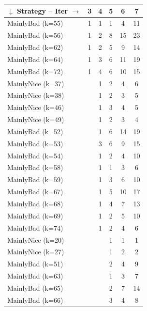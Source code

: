 \documentclass[journal,10pt,twoside]{IEEEtran}
\begin{document}
\begin{table}[ht]
\begin{minipage}{.35\textwidth}
\begin{tabular}{l|ccccc}
        $\downarrow$ Strategy -- Iter $\rightarrow$ & 3 & 4 & 5 & 6 & 7 \\ \midrule
        MainlyBad (k=55)    &    1 &    1 &    1 &    4 &   11 \\
        MainlyBad (k=56)    &    1 &    2 &    8 &   15 &   23 \\
        MainlyBad (k=62)    &    1 &    2 &    5 &    9 &   14 \\
        MainlyBad (k=64)    &    1 &    3 &    6 &   11 &   19 \\
        MainlyBad (k=72)    &    1 &    4 &    6 &   10 &   15 \\
        MainlyNice (k=37)   &      &    1 &    2 &    4 &    6 \\
        MainlyNice (k=38)   &      &    1 &    2 &    3 &    5 \\
        MainlyNice (k=46)   &      &    1 &    3 &    4 &    5 \\
        MainlyNice (k=49)   &      &    1 &    2 &    3 &    4 \\
        MainlyBad (k=52)    &      &    1 &    6 &   14 &   19 \\
        MainlyBad (k=53)    &      &    3 &    6 &    9 &   15 \\
        MainlyBad (k=54)    &      &    1 &    2 &    4 &   10 \\
        MainlyBad (k=58)    &      &    1 &    1 &    3 &    6 \\
        MainlyBad (k=59)    &      &    1 &    3 &    6 &   10 \\
        MainlyBad (k=67)    &      &    1 &    5 &   10 &   17 \\
        MainlyBad (k=68)    &      &    1 &    4 &    7 &   13 \\
        MainlyBad (k=69)    &      &    1 &    2 &    5 &   10 \\
        MainlyBad (k=74)    &      &    1 &    2 &    4 &    6 \\
        MainlyNice (k=20)   &      &      &    1 &    1 &    1 \\
        MainlyNice (k=27)   &      &      &    1 &    2 &    2 \\
        MainlyBad (k=51)    &      &      &    2 &    4 &    9 \\
        MainlyBad (k=63)    &      &      &    1 &    3 &    7 \\
        MainlyBad (k=65)    &      &      &    2 &    7 &   14 \\
        MainlyBad (k=66)    &      &      &    3 &    4 &    8 \\

\end{tabular}
\end{minipage}
\end{table}
\end{document}
